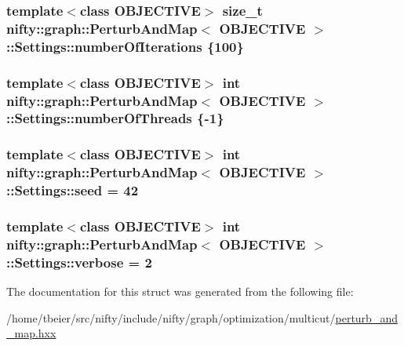 \subsubsection[{number\+Of\+Iterations}]{\setlength{\rightskip}{0pt plus 5cm}template$<$class O\+B\+J\+E\+C\+T\+I\+V\+E$>$ size\+\_\+t {\bf nifty\+::graph\+::\+Perturb\+And\+Map}$<$ O\+B\+J\+E\+C\+T\+I\+V\+E $>$\+::Settings\+::number\+Of\+Iterations \{100\}}\label{structnifty_1_1graph_1_1PerturbAndMap_1_1Settings_acb4d1b7e589efdd78034b3f6ead5c013}
\hypertarget{structnifty_1_1graph_1_1PerturbAndMap_1_1Settings_a6f9f777f1ad9b9b0a93704203967673a}{}
\subsubsection[{number\+Of\+Threads}]{\setlength{\rightskip}{0pt plus 5cm}template$<$class O\+B\+J\+E\+C\+T\+I\+V\+E$>$ int {\bf nifty\+::graph\+::\+Perturb\+And\+Map}$<$ O\+B\+J\+E\+C\+T\+I\+V\+E $>$\+::Settings\+::number\+Of\+Threads \{-\/1\}}\label{structnifty_1_1graph_1_1PerturbAndMap_1_1Settings_a6f9f777f1ad9b9b0a93704203967673a}
\hypertarget{structnifty_1_1graph_1_1PerturbAndMap_1_1Settings_a29646de8478bcf876ed30e301b3855a6}{}
\subsubsection[{seed}]{\setlength{\rightskip}{0pt plus 5cm}template$<$class O\+B\+J\+E\+C\+T\+I\+V\+E$>$ int {\bf nifty\+::graph\+::\+Perturb\+And\+Map}$<$ O\+B\+J\+E\+C\+T\+I\+V\+E $>$\+::Settings\+::seed = 42}\label{structnifty_1_1graph_1_1PerturbAndMap_1_1Settings_a29646de8478bcf876ed30e301b3855a6}
\hypertarget{structnifty_1_1graph_1_1PerturbAndMap_1_1Settings_a53ac8b50248dd5b9617fb65c5caa74a1}{}
\subsubsection[{verbose}]{\setlength{\rightskip}{0pt plus 5cm}template$<$class O\+B\+J\+E\+C\+T\+I\+V\+E$>$ int {\bf nifty\+::graph\+::\+Perturb\+And\+Map}$<$ O\+B\+J\+E\+C\+T\+I\+V\+E $>$\+::Settings\+::verbose = 2}\label{structnifty_1_1graph_1_1PerturbAndMap_1_1Settings_a53ac8b50248dd5b9617fb65c5caa74a1}


The documentation for this struct was generated from the following file\+:\begin{DoxyCompactItemize}
\item 
/home/tbeier/src/nifty/include/nifty/graph/optimization/multicut/\hyperlink{perturb__and__map_8hxx}{perturb\+\_\+and\+\_\+map.\+hxx}\end{DoxyCompactItemize}
